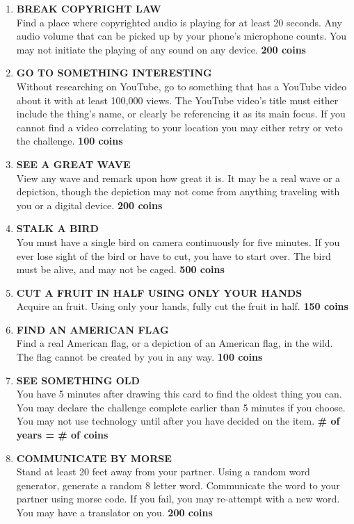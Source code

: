 \documentclass{article}
\begin{document}
\begin{enumerate}
    \item \textbf{BREAK COPYRIGHT LAW}\\ Find a place where copyrighted audio is playing for at least 20 seconds. Any audio volume that can be picked up by your phone's microphone counts. You may not initiate the playing of any sound on any device. \textbf{200 coins}
    \item \textbf{GO TO SOMETHING INTERESTING} \\ Without researching on YouTube, go to something that has a YouTube video about it with at least 100,000 views. The YouTube video's title must either include the thing's name, or clearly be referencing it as its main focus. If you cannot find a video correlating to your location you may either retry or veto the challenge. \textbf{100 coins}
    \item \textbf{SEE A GREAT WAVE} \\ View any wave and remark upon how great it is. It may be a real wave or a depiction, though the depiction may not come from anything traveling with you or a digital device. \textbf{200 coins}
    \item \textbf{STALK A BIRD} \\ You must have a single bird on camera continuously for five minutes. If you ever lose sight of the bird or have to cut, you have to start over. The bird must be alive, and may not be caged. \textbf{500 coins}
    \item \textbf{CUT A FRUIT IN HALF USING ONLY YOUR HANDS} \\ Acquire an fruit. Using only your hands, fully cut the fruit in half. \textbf{150 coins}
    \item \textbf{FIND AN AMERICAN FLAG} \\
    Find a real American flag, or a depiction of an American flag, in the wild. The flag cannot be created by you in any way. \textbf{100 coins}
    \item \textbf{SEE SOMETHING OLD} \\ You have 5 minutes after drawing this card to find the oldest thing you can. You may declare the challenge complete earlier than 5 minutes if you choose. You may not use technology until after you have decided on the item. \textbf{\# of years = \# of coins}
    \item \textbf{COMMUNICATE BY MORSE} \\ Stand at least 20 feet away from your partner. Using a random word generator, generate a random 8 letter word. Communicate the word to your partner using morse code. If you fail, you may re-attempt with a new word. You may have a translator on you. \textbf{200 coins}

\end{enumerate}
\end{document}
